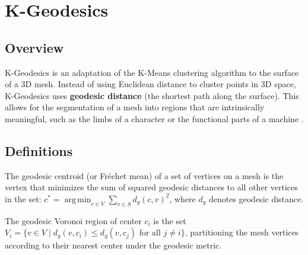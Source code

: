 \section{K-Geodesics}
\label{sec:k_geodesics}

\subsection{Overview}
K-Geodesics is an adaptation of the K-Means clustering algorithm to the surface of a 3D mesh. Instead of using Euclidean distance to cluster points in 3D space, K-Geodesics uses \textbf{geodesic distance} (the shortest path along the surface). This allows for the segmentation of a mesh into regions that are intrinsically meaningful, such as the limbs of a character or the functional parts of a machine \cite{lloyd1982}.

\subsection{Definitions}
\begin{definition}\label{def:geodesic_centroid}
The geodesic centroid (or Fr\'{e}chet mean) of a set of vertices on a mesh is the vertex that minimizes the sum of squared geodesic distances to all other vertices in the set: $c^* = \operatorname{arg\,min}_{c \in V} \sum_{v \in S} d_g(c, v)^2$, where $d_g$ denotes geodesic distance.
\end{definition}

\begin{definition}\label{def:geodesic_voronoi}
The geodesic Voronoi region of center $c_i$ is the set $V_i = \{v \in V \mid d_g(v, c_i) \le d_g(v, c_j) \text{ for all } j \ne i\}$, partitioning the mesh vertices according to their nearest center under the geodesic metric.
\end{definition}

